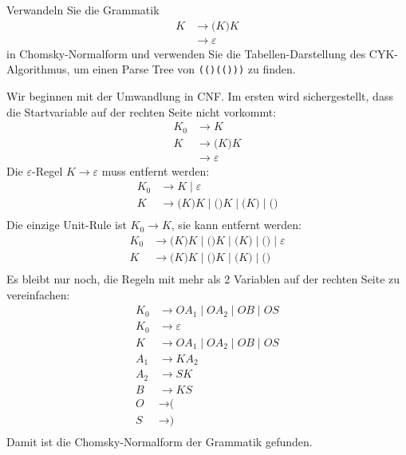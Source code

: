 Verwandeln Sie die Grammatik
\begin{align*}
K&\to \texttt{(}K\texttt{)}K \\
 &\to \varepsilon
\end{align*}
in Chomsky-Normalform und verwenden Sie die Tabellen-Darstellung
des CYK-Algorithmus, um einen Parse Tree von \texttt{(()(()))}
zu finden.


\begin{loesung}
Wir beginnen mit der Umwandlung in CNF.
Im ersten wird sichergestellt, dass die Startvariable auf der rechten
Seite nicht vorkommt:
\begin{align*}
K_0&\to K \\
K  &\to \texttt{(}K\texttt{)}K \\
   &\to \varepsilon
\end{align*}
Die $\varepsilon$-Regel $K\to\varepsilon$ muss entfernt werden:
\begin{align*}
K_0&\to K \;|\; \varepsilon\\
K  &\to \texttt{(}K\texttt{)}K \;|\; \texttt{()}K \;|\; \texttt{(}K\texttt{)} \;|\; \texttt{()}\\
\end{align*}
Die einzige Unit-Rule ist $K_0\to K$, sie kann entfernt werden:
\begin{align*}
K_0&\to \texttt{(}K\texttt{)}K \;|\; \texttt{()}K \;|\; \texttt{(}K\texttt{)} \;|\; \texttt{()}
\;|\; \varepsilon\\
K  &\to \texttt{(}K\texttt{)}K \;|\; \texttt{()}K \;|\; \texttt{(}K\texttt{)} \;|\; \texttt{()}\\
\end{align*}
Es bleibt nur noch, die Regeln mit mehr als 2 Variablen auf der rechten
Seite zu vereinfachen:
\begin{align*}
K_0
&\to
OA_1
\;|\;
OA_2
\;|\;
OB
\;|\;
OS
\\
K_0&\to
\varepsilon
\\
K
&\to
OA_1
\;|\;
OA_2
\;|\;
OB
\;|\;
OS
\\
A_1&\to KA_2 \\
A_2&\to SK \\
B  &\to KS \\
O&\to \texttt{(} \\
S&\to \texttt{)} \\
\end{align*}
Damit ist die Chomsky-Normalform der Grammatik gefunden.



\end{loesung}
